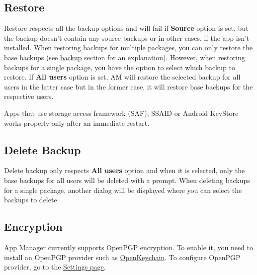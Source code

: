 \subsection{Restore}\label{subsec:backup-restore-restore}
Restore respects all the backup options and will fail if \textbf{Source} option is set, but the backup doesn't contain
any source backups or in other cases, if the app isn't installed. When restoring backups for multiple packages, you can
only restore the base backups (see \hyperref[subsec:backup-restore-backup]{backup} section for an explanation). However,
when restoring backups for a single package, you have the option to select which backup to restore. If
\textbf{All users} option is set, AM will restore the selected backup for all users in the latter case but in the former
case, it will restore base backups for the respective users.

\begin{tip}[Notice]
    Apps that use storage access framework (SAF), SSAID or Android KeyStore works properly only after an immediate restart.
\end{tip}

\subsection{Delete Backup}\label{subsec:backup-restore-delete-backup}
Delete backup only respects \textbf{All users} option and when it is selected, only the base backups for all users will
be deleted with a prompt. When deleting backups for a single package, another dialog will be displayed where you can
select the backups to delete.

\subsection{Encryption}\label{subsec:backup-restore-encryption}
App Manager currently supports OpenPGP encryption. To enable it, you need to install an OpenPGP provider such as
\href{https://openkeychain.org}{OpenKeychain}. To configure OpenPGP provider, go to the
\hyperref[subsubsec:settings-encryption]{Settings page}.
